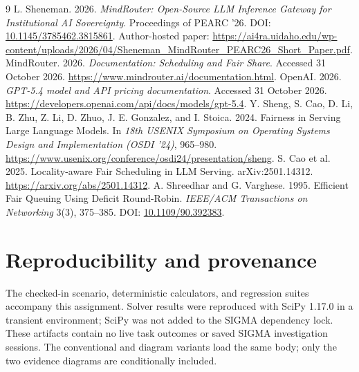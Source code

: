 \begin{thebibliography}{9}
 L. Sheneman. 2026. \emph{MindRouter: Open-Source LLM Inference Gateway for Institutional AI Sovereignty}. Proceedings of PEARC '26. DOI: \href{https://doi.org/10.1145/3785462.3815861}{10.1145/3785462.3815861}. Author-hosted paper: \url{https://ai4ra.uidaho.edu/wp-content/uploads/2026/04/Sheneman_MindRouter_PEARC26_Short_Paper.pdf}.
 MindRouter. 2026. \emph{Documentation: Scheduling and Fair Share}. Accessed 31 October 2026. \url{https://www.mindrouter.ai/documentation.html}.
 OpenAI. 2026. \emph{GPT-5.4 model and API pricing documentation}. Accessed 31 October 2026. \url{https://developers.openai.com/api/docs/models/gpt-5.4}.
 Y. Sheng, S. Cao, D. Li, B. Zhu, Z. Li, D. Zhuo, J. E. Gonzalez, and I. Stoica. 2024. Fairness in Serving Large Language Models. In \emph{18th USENIX Symposium on Operating Systems Design and Implementation (OSDI '24)}, 965--980. \url{https://www.usenix.org/conference/osdi24/presentation/sheng}.
 S. Cao et al. 2025. Locality-aware Fair Scheduling in LLM Serving. arXiv:2501.14312. \url{https://arxiv.org/abs/2501.14312}.
 A. Shreedhar and G. Varghese. 1995. Efficient Fair Queuing Using Deficit Round-Robin. \emph{IEEE/ACM Transactions on Networking} 3(3), 375--385. DOI: \href{https://doi.org/10.1109/90.392383}{10.1109/90.392383}.
\end{thebibliography}

\section*{Reproducibility and provenance}
The checked-in scenario, deterministic calculators, and regression suites accompany this assignment. Solver results were reproduced with SciPy 1.17.0 in a transient environment; SciPy was not added to the SIGMA dependency lock. These artifacts contain no live task outcomes or saved SIGMA investigation sessions. The conventional and diagram variants load the same body; only the two evidence diagrams are conditionally included.
